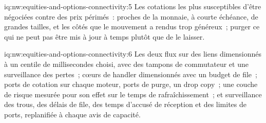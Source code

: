 \begin{solution}{iq:nw:equities-and-options-connectivity:5}
Les cotations les plus susceptibles d'être négociées contre des prix périmés~: proches de la monnaie, à courte échéance, de grandes tailles, et les côtés que le mouvement a rendus trop
 généreux~; purger ce qui ne peut pas être mis à jour à temps plutôt que de le laisser.
\end{solution}

\begin{solution}{iq:nw:equities-and-options-connectivity:6}
Les deux flux sur des liens dimensionnés à un centile de millisecondes choisi, avec des tampons de commutateur et une surveillance des pertes~; cœurs de handler dimensionnés avec un
 budget de file~; ports de cotation sur chaque moteur, ports de purge, un drop copy~; une couche de risque mesurée pour son effet sur le temps de rafraîchissement~; et
 surveillance des trous, des délais de file, des temps d'accusé de réception et des limites de ports, replanifiée à chaque avis de capacité.
\end{solution}
